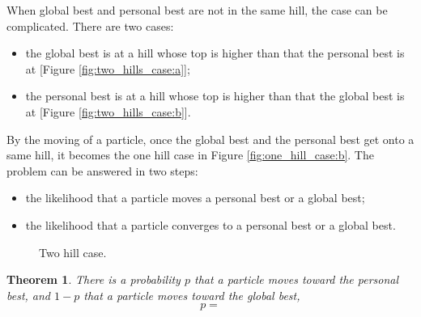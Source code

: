 \documentclass[10pt,a4paper]{article}
\newtheorem{theorem}{Theorem}
\begin{document}
When global best and personal best are not in the same hill, the case can be complicated.
There are two cases:
\begin{itemize}
\item the global best is at a hill whose top is higher than that the personal best is at [Figure \ref{fig:two_hills_case:a}];
\item the personal best is at a hill whose top is higher than that the global best is at [Figure \ref{fig:two_hills_case:b}]. 
\end{itemize}
By the moving of a particle, once the global best and the personal best get onto a same hill, it becomes the one hill case in Figure \ref{fig:one_hill_case:b}.
The problem can be answered in two steps:
\begin{itemize}
\item the likelihood that a particle moves a personal best or a global best;
\item the likelihood that a particle converges to a personal best or a global best.
\end{itemize}

\begin{figure}
\centering
{}
\caption{Two hill case.}
\label{fig:two_hills_case}
\end{figure}


\begin{theorem}
There is a probability $ p $  that a particle moves toward the personal best, and $ 1 - p $ that a particle moves toward the global best,
\begin{equation}
p = 
\end{equation}
\end{theorem}
\end{document}
